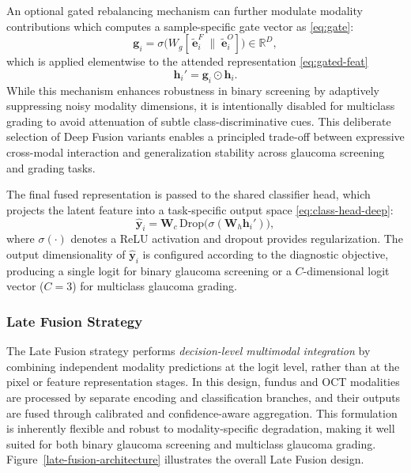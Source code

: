 \documentclass[preprint,12pt]{elsarticle}
\newcommand{\eqrefp}[1]{\eqref{#1}}
\begin{document}
An optional gated rebalancing mechanism can further modulate modality contributions which computes a sample-specific gate vector as \eqrefp{eq:gate}:
\begin{equation}
    \mathbf{g}_i =
    \sigma\!\bigl(W_g [\,\tilde{\mathbf{e}}_i^{F} \;\|\; \tilde{\mathbf{e}}_i^{O}] \bigr)
    \in \mathbb{R}^{D},
    \label{eq:gate}
\end{equation}
which is applied elementwise to the attended representation \eqrefp{eq:gated-feat}
\begin{equation}
    \mathbf{h}_i' = \mathbf{g}_i \odot \mathbf{h}_i.
    \label{eq:gated-feat}
\end{equation}
While this mechanism enhances robustness in binary screening by adaptively suppressing noisy modality dimensions, it is intentionally disabled for multiclass grading to avoid attenuation of subtle class-discriminative cues. This deliberate selection of Deep Fusion variants enables a principled trade-off between expressive cross-modal interaction and generalization stability across glaucoma screening and grading tasks.

The final fused representation is passed to the shared classifier head, which projects the latent feature into a task-specific output space \eqrefp{eq:class-head-deep}:
\begin{equation}
    \hat{\mathbf{y}}_i =
    \mathbf{W}_c \,
    \mathrm{Drop}\!\bigl(\sigma(\mathbf{W}_h \mathbf{h}_i')\bigr),
    \label{eq:class-head-deep}
\end{equation}
where $\sigma(\cdot)$ denotes a ReLU activation and dropout provides regularization. The output dimensionality of $\hat{\mathbf{y}}_i$ is configured according to the diagnostic objective, producing a single logit for binary glaucoma screening or a $C$-dimensional logit vector ($C=3$) for multiclass glaucoma grading.



\subsubsection{Late Fusion Strategy}
\label{subsubsec-latefusion}

The Late Fusion strategy performs \emph{decision-level multimodal integration} by combining independent modality predictions at the logit level, rather than at the pixel or feature representation stages. In this design, fundus and OCT modalities are processed by separate encoding and classification branches, and their outputs are fused through calibrated and confidence-aware aggregation. This formulation is inherently flexible and robust to modality-specific degradation, making it well suited for both binary glaucoma screening and multiclass glaucoma grading. Figure~\ref{late-fusion-architecture} illustrates the overall Late Fusion design.
\end{document}
